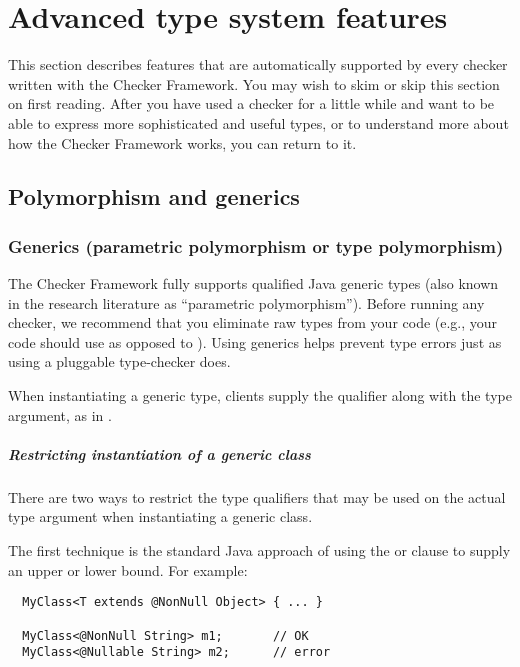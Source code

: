 \htmlhr
\chapter{Advanced type system features\label{advanced-type-system-features}}

This section describes features that are automatically supported by every
checker written with the Checker Framework.
You may wish to skim or skip this section on first reading.  After you have
used a checker for a little while and want to be able to express more
sophisticated and useful types, or to understand more about how the Checker
Framework works, you can return to it.


\section{Polymorphism and generics\label{polymorphism}}

\subsection{Generics (parametric polymorphism or type polymorphism)\label{generics}}

The Checker Framework fully supports
qualified Java generic types (also known in the research literature as ``parametric
polymorphism'').  Before running any checker, we recommend that you eliminate
raw types from your code (e.g., your code should use  as
opposed to ).
Using generics helps prevent type errors just as using a pluggable
type-checker does.

When instantiating a generic type,
clients supply the qualifier along with the type argument, as in
.


\paragraph{Restricting instantiation of a generic class}

There are two ways to restrict the type qualifiers that may be used on
the actual type argument when instantiating a generic class.

The first technique is the standard Java approach of using the
 or  clause to supply an upper or lower bound.
For example:

\begin{Verbatim}
  MyClass<T extends @NonNull Object> { ... }

  MyClass<@NonNull String> m1;       // OK
  MyClass<@Nullable String> m2;      // error
\end{Verbatim}

